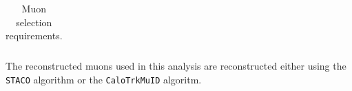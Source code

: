 \begin{table}[]
\begin{tabular}{ l  l l }
%
    \hline \hline
  \end{tabular}
   \caption{Muon selection requirements.}
   \label{table:objsel-el}
\end{table}

The reconstructed muons used in this analysis are reconstructed either using the
\verb|STACO| algorithm or the \verb|CaloTrkMuID| algoritm. 

